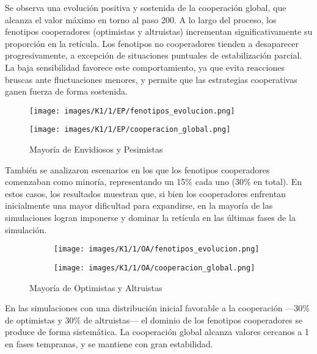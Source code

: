 \documentclass[a4paper,12pt]{report}
\begin{document}
Se observa una evolución positiva y sostenida de la cooperación global, que alcanza el valor máximo en torno al paso 200. A lo largo del proceso, los fenotipos cooperadores (optimistas y altruistas) incrementan significativamente su proporción en la retícula. Los fenotipos no cooperadores tienden a desaparecer progresivamente, a excepción de situaciones puntuales de estabilización parcial. La baja sensibilidad favorece este comportamiento, ya que evita reacciones bruscas ante fluctuaciones menores, y permite que las estrategias cooperativas ganen fuerza de forma sostenida.


\begin{figure}[h]
    \centering
    \begin{minipage}{0.49\textwidth}
    \centering
    \texttt{[image: images/K1/1/EP/fenotipos\_evolucion.png]}
    \label{fig:enter-label}
    \end{minipage}
    \hfill
    \begin{minipage}{0.49\textwidth}
    \centering
    \texttt{[image: images/K1/1/EP/cooperacion\_global.png]}
    \label{fig:enter-label}
    \end{minipage}
    \caption{Mayoría de Envidiosos y Pesimistas}
\end{figure}

También se analizaron escenarios en los que los fenotipos cooperadores comenzaban como minoría, representando un 15\% cada uno (30\% en total). En estos casos, los resultados muestran que, si bien los cooperadores enfrentan inicialmente una mayor dificultad para expandirse, en la mayoría de las simulaciones logran imponerse y dominar la retícula en las últimas fases de la simulación.

\begin{figure}[h]
    \centering
    \begin{subfigure}[t]{0.49\textwidth}
        \centering
        \texttt{[image: images/K1/1/OA/fenotipos\_evolucion.png]}
        \label{fig:enter-label}
    \end{subfigure}
    \hfill
    \begin{subfigure}[t]{0.49\textwidth}
        \centering
        \texttt{[image: images/K1/1/OA/cooperacion\_global.png]}
        \label{fig:enter-label}
    \end{subfigure}
    \caption{Mayoría de Optimistas y Altruistas}
\end{figure}

En las simulaciones con una distribución inicial favorable a la cooperación —30\% de optimistas y 30\% de altruistas— el dominio de los fenotipos cooperadores se produce de forma sistemática. La cooperación global alcanza valores cercanos a 1 en fases tempranas, y se mantiene con gran estabilidad.
\end{document}
